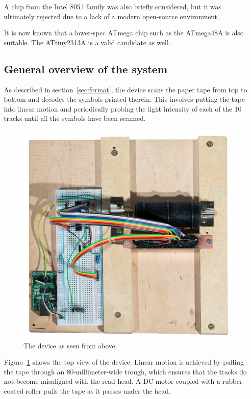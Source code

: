 \documentclass{article}
\begin{document}
	A chip from the Intel 8051 family was also briefly considered, but it was
	ultimately rejected due to a lack of a modern open-source environment.
	
	It is now known that a lower-spec ATmega chip such as the ATmega48A is also
	suitable. The ATtiny2313A is a valid candidate as well.
	
	\subsection{General overview of the system}
	
	As described in section~\ref{sec:format}, the device scans the paper tape
	from top to bottom and decodes the symbols printed therein. This involves
	putting the tape into linear motion and periodically probing the light
	intensity of each of the 10 tracks until all the symbols have been scanned.
	
	\begin{figure}[h]
		\begin{center}
			\includegraphics[width=0.75\linewidth]{img/topview}
			\caption{The device as seen from above.}
			\label{fig:topview}
		\end{center}
	\end{figure}
	
	Figure~\ref{fig:topview} shows the top view of the device. Linear motion is
	achieved by pulling the tape through an 80-millimeter-wide trough, which
	ensures that the tracks do not become misaligned with the read head. A DC
	motor coupled with a rubber-coated roller pulls the tape as it passes under
	the head.
	
\end{document}
